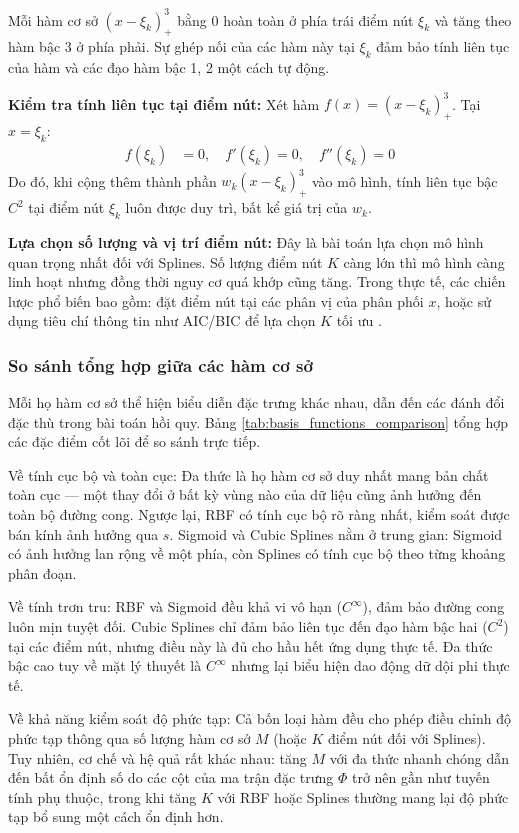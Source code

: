 Mỗi hàm cơ sở $(x - \xi_k)_+^3$ bằng 0 hoàn toàn ở phía trái điểm nút $\xi_k$ và tăng theo hàm bậc 3 ở phía phải. Sự ghép nối của các hàm này tại $\xi_k$ đảm bảo tính liên tục của hàm và các đạo hàm bậc 1, 2 một cách tự động.

\textbf{Kiểm tra tính liên tục tại điểm nút:} Xét hàm $f(x) = (x-\xi_k)_+^3$. Tại $x = \xi_k$:
\begin{align*}
f(\xi_k) &= 0, \quad f'(\xi_k) = 0, \quad f''(\xi_k) = 0
\end{align*}
Do đó, khi cộng thêm thành phần $w_k (x-\xi_k)_+^3$ vào mô hình, tính liên tục bậc $C^2$ tại điểm nút $\xi_k$ luôn được duy trì, bất kể giá trị của $w_k$.

\textbf{Lựa chọn số lượng và vị trí điểm nút:} Đây là bài toán lựa chọn mô hình quan trọng nhất đối với Splines. Số lượng điểm nút $K$ càng lớn thì mô hình càng linh hoạt nhưng đồng thời nguy cơ quá khớp cũng tăng. Trong thực tế, các chiến lược phổ biến bao gồm: đặt điểm nút tại các phân vị của phân phối $x$, hoặc sử dụng tiêu chí thông tin như AIC/BIC để lựa chọn $K$ tối ưu \cite{bishop2006pattern}.

\subsubsection{So sánh tổng hợp giữa các hàm cơ sở}

Mỗi họ hàm cơ sở thể hiện biểu diễn đặc trưng khác nhau, dẫn đến các đánh đổi đặc thù trong bài toán hồi quy. Bảng \ref{tab:basis_functions_comparison} tổng hợp các đặc điểm cốt lõi để so sánh trực tiếp.

Về tính cục bộ và toàn cục: Đa thức là họ hàm cơ sở duy nhất mang bản chất toàn cục — một thay đổi ở bất kỳ vùng nào của dữ liệu cũng ảnh hưởng đến toàn bộ đường cong. Ngược lại, RBF có tính cục bộ rõ ràng nhất, kiểm soát được bán kính ảnh hưởng qua $s$. Sigmoid và Cubic Splines nằm ở trung gian: Sigmoid có ảnh hưởng lan rộng về một phía, còn Splines có tính cục bộ theo từng khoảng phân đoạn.

Về tính trơn tru: RBF và Sigmoid đều khả vi vô hạn ($C^{\infty}$), đảm bảo đường cong luôn mịn tuyệt đối. Cubic Splines chỉ đảm bảo liên tục đến đạo hàm bậc hai ($C^2$) tại các điểm nút, nhưng điều này là đủ cho hầu hết ứng dụng thực tế. Đa thức bậc cao tuy về mặt lý thuyết là $C^{\infty}$ nhưng lại biểu hiện dao động dữ dội phi thực tế.

Về khả năng kiểm soát độ phức tạp: Cả bốn loại hàm đều cho phép điều chỉnh độ phức tạp thông qua số lượng hàm cơ sở $M$ (hoặc $K$ điểm nút đối với Splines). Tuy nhiên, cơ chế và hệ quả rất khác nhau: tăng $M$ với đa thức nhanh chóng dẫn đến bất ổn định số do các cột của ma trận đặc trưng $\Phi$ trở nên gần như tuyến tính phụ thuộc, trong khi tăng $K$ với RBF hoặc Splines thường mang lại độ phức tạp bổ sung một cách ổn định hơn.

